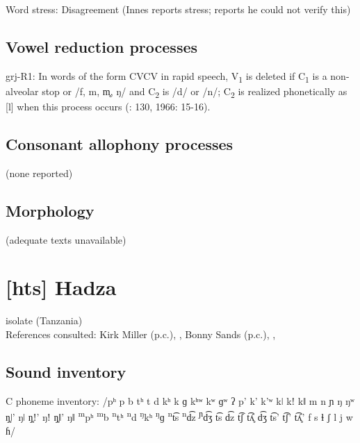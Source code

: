 {\begin{appendixdesc}
\item[Word stress:] Disagreement (Innes reports stress; \citealt{Newman1986} reports he could not verify this)
\end{appendixdesc}
\subsection*{Vowel reduction processes}
\begin{appendixdesc}

\item[grj-R1:] In words of the form CVCV in rapid speech, V\textsubscript{1} is deleted if C\textsubscript{1} is a non-alveolar stop or /f, m, m̥, ŋ/ and C\textsubscript{2} is /d/ or /n/; C\textsubscript{2} is realized phonetically as [l] when this process occurs (\citealt{Innes1981}: 130, 1966: 15-16).
\end{appendixdesc}
\subsection*{Consonant allophony processes}
(none reported)

\subsection*{Morphology}

(adequate texts unavailable)
\section*{[hts] Hadza}   %
isolate (Tanzania)\medskip\\
References consulted: Kirk Miller (p.c.), \citet{Sands2013}, Bonny Sands (p.c.), \citet{SandsEtAl1996}, \citet{TuckerWoodburn1977}

\subsection*{Sound inventory}
\begin{appendixdesc}

\item[C phoneme inventory:] /pʰ p b tʰ t d kʰ k ɡ kʰʷ kʷ ɡʷ ʔ p’ k’ k’ʷ kǀ kǃ kǁ m n ɲ ŋ ŋʷ ŋ̥ǀ’ ŋǀ ŋ̥ǃ’ ŋǃ ŋ̥ǁ’ ŋǁ \textsuperscript{m}pʰ \textsuperscript{m}b \textsuperscript{n}tʰ \textsuperscript{n}d \textsuperscript{ŋ}kʰ \textsuperscript{ŋ}ɡ \textsuperscript{n}t͡s \textsuperscript{n}d͡z \textsuperscript{ɲ}d͡ʒ t͡s d͡z t͡ʃ t͡ʎ̥ d͡ʒ t͡s’ t͡ʃ’ t͡ʎ̥’ f s ɬ ʃ l j w ɦ/


\end{appendixdesc}}
